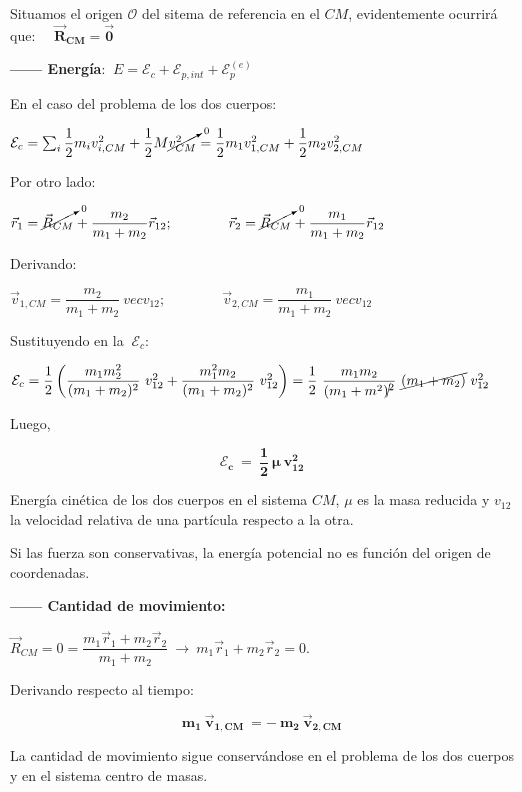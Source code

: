 Situamos el origen $\mathcal O$ del sitema de referencia en el $CM$, evidentemente ocurrirá que: $\quad \boldsymbol {\overrightarrow{R}_{CM}=\vec 0}$

\textbf{------ Energía}: $\ E=\mathcal E_c+\mathcal E_{p,int} + \mathcal E_p^{(e)}$

En el caso del problema de los dos cuerpos:

$\mathcal E_c=\sum_i \dfrac 1 2 m_i v_{i,CM}^2+\dfrac 1 2 M \cancelto{0}{v_{CM}^2}=\dfrac 1 2 m_1 v_{1,CM}^2 +\dfrac 1 2 m_2 v_{2,CM}^2$

Por otro lado:

$\vec r_1=\cancelto{0}{\vec R_{CM}}+\dfrac{m_2}{m_1+m_2}\vec r_{12}; \qquad \qquad \vec r_2=\cancelto{0}{\vec R_{CM}}+\dfrac{m_1}{m_1+m_2}\vec r_{12}$

Derivando:

$\vec v_{1,CM}=\dfrac {m_2}{m_1+m_2}\ vec v_{12}; \qquad \qquad \vec v_{2,CM}=\dfrac {m_1}{m_1+m_2}\ vec v_{12}$

Sustituyendo en la $\ \mathcal E_c$:

\small{$\mathcal E_c= \dfrac 1 2 \left( \dfrac {m_1m_2^2}{(m_1+m_2)^2}\ v_{12}^2+  \dfrac {m_1^2m_2}{(m_1+m_2)^2}\ v_{12}^2  \right) = \dfrac 1 2 \ \dfrac{m_1m_2}{(m_1+m^2)^{\cancel{}2}}\ \cancel{(m_1+m_2)} \ v_{12}^2$}
 
 \normalsize{Luego,}
 
 \begin{equation}
 \boldsymbol{ \mathcal E_c \ = \ \dfrac 1 2 \ \mu \ v_{12}^2	 }
 \end{equation}

Energía cinética de los dos cuerpos en el sistema $CM$, $\mu$ es la masa reducida y $v_{12}$ la velocidad relativa de una partícula respecto a la otra.

Si las fuerza son conservativas, la energía potencial no es función del origen de coordenadas.

\textbf{------ Cantidad de movimiento:}

$\overrightarrow R_{CM}=0=\dfrac{m_1 \vec r_1 + m_2 \vec r_2}{m_1+m_2} \ \to \ m_1 \vec r_1 + m_2 \vec r_2=0$. 

Derivando respecto al tiempo:

\begin{equation}
\boldsymbol{
m_1 \ \vec v_{1,CM }\ = - \ m_2 \ \vec v_{2,CM}
}	
\end{equation}

La cantidad de movimiento sigue conservándose en el problema de los dos cuerpos y en el sistema centro de masas.

